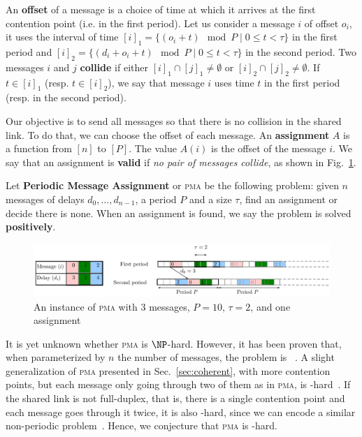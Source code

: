 \documentclass[a4paper,UKenglish,cleveref, autoref, thm-restate]{lipics-v2019}
\newcommand\pma{\textsc{pma}\xspace}
\begin{document}
An \textbf{offset} of a message is a choice of time at which it arrives at the first contention point (i.e. in the first period). Let us consider a message $i$ of offset $o_i$, it uses the interval of time $[i]_1 = \{ (o_i + t) \mod P \mid 0 \leq t < \tau \}$ in the first period and $[i]_2 = \{ (d_i + o_i + t) \mod P \mid 0 \leq t < \tau \}$ in the second period. Two messages $i$ and $j$ \textbf{collide} if either $[i]_1 \cap [j]_1 \neq \emptyset $ or $[i]_2 \cap [j]_2 \neq \emptyset $. If $t \in [i]_1$ (resp. $t \in [i]_2$), we say that message $i$ uses time $t$ in the first period (resp. in the second period).
 
Our objective is to send all messages so that there is no collision in the shared link.
To do that, we can choose the offset of each message. An \textbf{assignment} $A$ is a function from $[n]$ to $[P]$. The value $A(i)$ is the offset of the message $i$. We say that an assignment is \textbf{valid} if \emph{no pair of messages collide}, as shown in Fig.~\ref{fig:assignment}.

Let \textbf{Periodic Message Assignment} or \pma be the following problem: given $n$ messages of delays $d_0,\dots,d_{n-1}$, a period $P$ and a size $\tau$, find an assignment or decide there is none. When an assignment is found, we say the problem is solved \textbf{positively}.

\begin{figure}
\begin{center}
\includegraphics[scale=0.7]{instance}
\end{center}
\caption{An instance of \pma with $3$ messages, $P= 10$, $\tau = 2$, and one assignment}
\label{fig:assignment}
\end{figure}

It is yet unknown whether \pma is $\NP$-hard. However, it has been proven that, when parameterized by $n$ the number of messages, the problem is \FPT~\cite{barth2018deterministic}. A slight generalization of \pma presented in Sec.~\ref{sec:coherent}, with more contention points, but each message only going through two of them as in \pma, is \NP-hard~\cite{barth2018deterministic}. If the shared link is not full-duplex, that is, there is a single contention point and each message goes through it twice, it is also \NP-hard, since we can encode a similar non-periodic problem~\cite{orman1997complexity}. 
Hence, we conjecture that \pma is \NP-hard.
	
\end{document}
